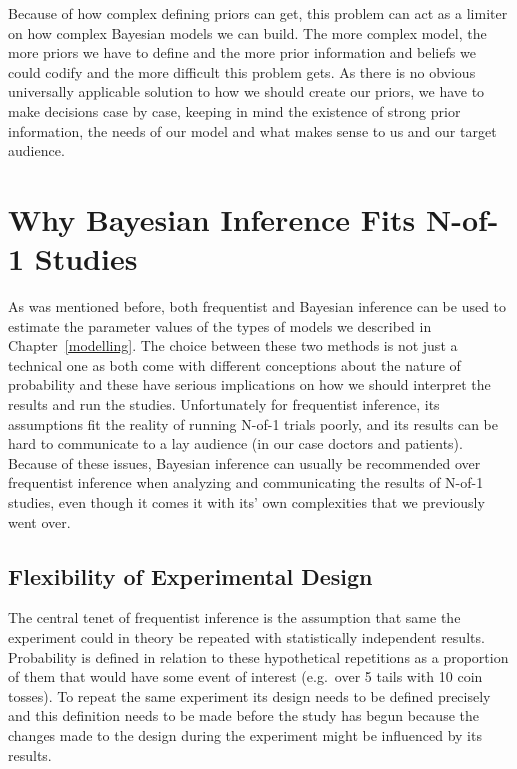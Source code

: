 \documentclass[12pt,a4paper,leqno]{report}
\theoremstyle{plain}
\theoremstyle{definition}
\theoremstyle{remark}
\begin{document}
Because of how complex defining priors can get, this problem can act as a limiter on
how complex Bayesian models we can build. The more complex model, the more priors we
have to define and the more prior information and beliefs we could codify and
the more difficult this problem gets. As there is no obvious universally applicable
solution to how we should create our priors, we have to make decisions case by case,
keeping in mind the existence of strong prior information, the needs of our model and
what makes sense to us and our target audience.

\section{Why Bayesian Inference Fits N-of-1 Studies}\label{whybayes}

As was mentioned before, both frequentist and Bayesian inference can be used to
estimate the parameter values of the types of models we described
in Chapter\ \ref{modelling}. The choice between these two methods is not just a
technical one as both come with different conceptions about the nature of probability
and these have serious implications on how we should interpret the results and run the studies.
Unfortunately for frequentist inference, its assumptions fit the reality of running
N-of-1 trials poorly, and its results can be hard to communicate to a lay
audience (in our case doctors and patients). Because of these issues, Bayesian inference
can usually be recommended over frequentist inference when analyzing and
communicating the results of N-of-1 studies, even though it comes it with its'
own complexities that we previously went over.

\subsection{Flexibility of Experimental Design}\label{whybayes}

The central tenet of frequentist inference is the assumption that same the
experiment could in theory be repeated with statistically independent results. Probability
is defined in relation to these hypothetical repetitions as a proportion of them
that would have some event of interest (e.g.\ over 5 tails with 10 coin tosses).
To repeat the same experiment its design needs to be defined precisely and this
definition needs to be made before the study has begun because the changes made
to the design during the experiment might be influenced by its results.
\end{document}
